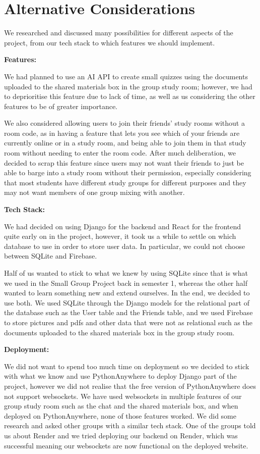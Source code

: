 \section{Alternative Considerations}
\label{sect:alternative-considerations}
We researched and discussed many possibilities for different aspects of the project, from our tech stack to which features we should implement.

\textbf{Features:}

We had planned to use an AI API to create small quizzes using the documents uploaded to the shared materials box in the group study room; however, we had to deprioritise this feature due to lack of time, as well as us considering the other features to be of greater importance.

We also considered allowing users to join their friends' study rooms without a room code, as in having a feature that lets you see which of your friends are currently online or in a study room, and being able to join them in that study room without needing to enter the room code. After much deliberation, we decided to scrap this feature since users may not want their friends to just be able to barge into a study room without their permission, especially considering that most students have different study groups for different purposes and they may not want members of one group mixing with another.


\textbf{Tech Stack:}

We had decided on using Django for the backend and React for the frontend quite early on in the project, however, it took us a while to settle on which database to use in order to store user data. In particular, we could not choose between SQLite and Firebase.

Half of us wanted to stick to what we knew by using SQLite since that is what we used in the Small Group Project back in semester 1, whereas the other half wanted to learn something new and extend ourselves. In the end, we decided to use both. We used SQLite through the Django models for the relational part of the database such as the User table and the Friends table, and we used Firebase to store pictures and pdfs and other data that were not as relational such as the documents uploaded to the shared materials box in the group study room.

\textbf{Deployment:}

We did not want to spend too much time on deployment so we decided to stick with what we know and use PythonAnywhere to deploy Django part of the project, however we did not realise that the free version of PythonAnywhere does not support websockets. We have used websockets in multiple features of our group study room such as the chat and the shared materials box, and when deployed on PythonAnywhere, none of those features worked. We did some research and asked other groups with a similar tech stack. One of the groups told us about Render and we tried deploying our backend on Render, which was successful meaning our websockets are now functional on the deployed website.

